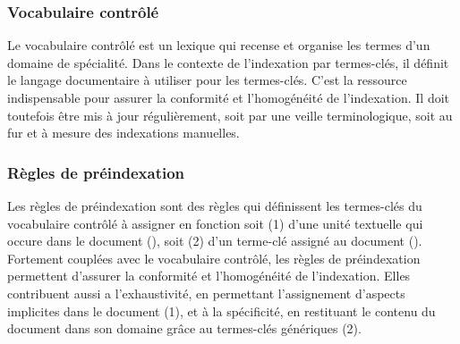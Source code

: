       \subsubsection{Vocabulaire contrôlé}
      \label{subsubsec:main-domain_specific_keyphrase_annotation-manual_keyphrase_annotation-resources-controlled_vocabulary}
        Le vocabulaire contrôlé est un lexique qui recense et organise les
        termes d'un domaine de spécialité. Dans le contexte de l'indexation par
        termes-clés, il définit le langage documentaire à utiliser pour les
        termes-clés. C'est la ressource indispensable pour assurer la conformité
        et l'homogénéité de l'indexation. Il doit toutefois être mis à jour
        régulièrement, soit par une veille terminologique, soit au fur et à
        mesure des indexations manuelles.

      \subsubsection{Règles de préindexation}
      \label{subsubsec:main-domain_specific_keyphrase_annotation-manual_keyphrase_annotation-resources-preindexing_rules}
        Les règles de préindexation sont des règles qui définissent les
        termes-clés du vocabulaire contrôlé à assigner en fonction soit (1)
        d'une unité textuelle qui occure dans le document (), soit
        (2) d'un terme-clé assigné au document (). Fortement
        couplées avec le vocabulaire contrôlé, les règles de préindexation
        permettent d'assurer la conformité et l'homogénéité de l'indexation.
        Elles contribuent aussi a l'exhaustivité, en permettant l'assignement
        d'aspects implicites dans le document (1), et à la spécificité, en
        restituant le contenu du document dans son domaine grâce au termes-clés
        génériques (2).

